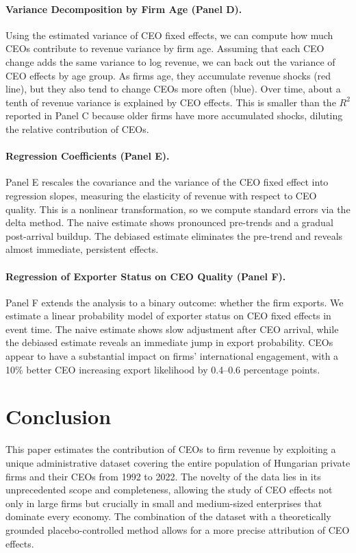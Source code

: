 \documentclass[11pt,a4paper]{article}
\begin{document}
\paragraph{Variance Decomposition by Firm Age (Panel D).} Using the estimated variance of CEO fixed effects, we can compute how much CEOs contribute to revenue variance by firm age. Assuming that each CEO change adds the same variance to log revenue, we can back out the variance of CEO effects by age group. As firms age, they accumulate revenue shocks (red line), but they also tend to change CEOs more often (blue). Over time, about a tenth of revenue variance is explained by CEO effects. This is smaller than the $R^2$ reported in Panel C because older firms have more accumulated shocks, diluting the relative contribution of CEOs.

\paragraph{Regression Coefficients (Panel E).} Panel E rescales the covariance and the variance of the CEO fixed effect into regression slopes, measuring the elasticity of revenue with respect to CEO quality. This is a nonlinear transformation, so we compute standard errors via the delta method. The naive estimate shows pronounced pre-trends and a gradual post-arrival buildup. The debiased estimate eliminates the pre-trend and reveals almost immediate, persistent effects. 

\paragraph{Regression of Exporter Status on CEO Quality (Panel F).} Panel F extends the analysis to a binary outcome: whether the firm exports. We estimate a linear probability model of exporter status on CEO fixed effects in event time. The naive estimate shows slow adjustment after CEO arrival, while the debiased estimate reveals an immediate jump in export probability. CEOs appear to have a substantial impact on firms' international engagement, with a 10\% better CEO increasing export likelihood by 0.4--0.6 percentage points.


\section{Conclusion}

This paper estimates the contribution of CEOs to firm revenue by exploiting a unique administrative dataset covering the entire population of Hungarian private firms and their CEOs from 1992 to 2022. The novelty of the data lies in its unprecedented scope and completeness, allowing the study of CEO effects not only in large firms but crucially in small and medium-sized enterprises that dominate every economy. The combination of the dataset with a theoretically grounded placebo-controlled method allows for a more precise attribution of CEO effects. 
\end{document}
